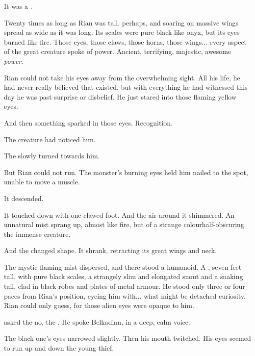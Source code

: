 It was a \dragon. 

Twenty times as long as Rian was tall, perhaps, and soaring on massive wings spread as wide as it was long. 
Its scales were pure black like onyx, but its eyes burned like fire. 
Those eyes, those claws, those horns, those wings... every aspect of the great creature spoke of power. 
Ancient, terrifying, majestic, awesome \emph{power}. 

Rian could not take his eyes away from the overwhelming sight. 
All his life, he had never really believed that \dragons{} existed, but with everything he had witnessed this day he was past surprise or disbelief. 
He just stared into those flaming yellow eyes. 

And then something sparked in those eyes. 
Recognition. 

The creature had noticed him.


The \dragon{} slowly turned towards him. 


But Rian could not run. 
The monster's burning eyes held him nailed to the spot, unable to move a muscle. 

It descended. 

It touched down with one clawed foot. 
And the air around it shimmered. 
An unnatural mist sprang up, almost like fire, but of a strange colour\dash{}\dash half-obscuring the immense creature. 

And the \dragon{} changed shape. 
It shrank, retracting its great wings and neck. 

The mystic flaming mist dispersed, and there stood a humanoid. 
A \scatha, seven feet tall, with pure black scales, a strangely slim and elongated snout and a snaking tail, clad in black robes and plates of metal armour. 
He stood only three or four paces from Rian's position, eyeing him with... what might be detached curiosity. 
Rian could only guess, for those alien eyes were opaque to him. 

 asked the \scatha{}\dash no, the \dragon. He spoke Belkadian, in a deep, calm voice. 


The black one's eyes narrowed slightly. 
Then his mouth twitched. 
His eyes seemed to run up and down the young thief.

